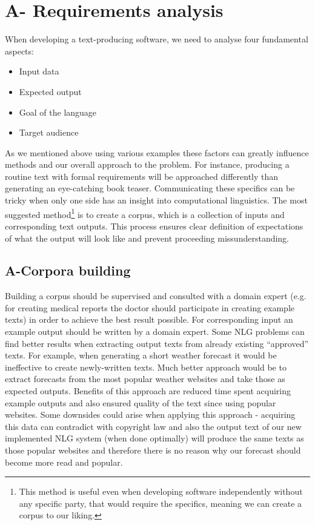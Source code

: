 \chapter{A- Requirements analysis}

When developing a text-producing software, we need to analyse four fundamental aspects:

\begin{itemize}
\item Input data
\item Expected output
\item Goal of the language 
\item Target audience  
\end{itemize}

As we mentioned above using various examples these factors can greatly influence methods and our overall approach to the problem. For instance, producing a routine text with formal requirements will be approached differently than generating an eye-catching book teaser. Communicating these specifics can be tricky when only one side has an insight into computational linguistics. The most suggested method\footnote{This method is useful even when developing software independently without any specific party, that would require the specifics, meaning we can create a corpus to our liking.} is to create a corpus, which is a collection of inputs and corresponding text outputs. This process ensures clear definition of expectations of what the output will look like and prevent proceeding missunderstanding. 

\section{A-Corpora building}
Building a corpus should be supervised and consulted with a domain expert (e.g. for creating medical reports the doctor should participate in creating example texts) in order to achieve the best result possible. For corresponding input an example output should be written by a domain expert. Some NLG problems can find better results when extracting output texts from already existing “approved” texts. For example, when generating a short weather forecast it would be ineffective to create newly-written texts. Much better approach would be to extract forecasts from the most popular weather websites and take those as expected outputs. Benefits of this approach are reduced time spent acquiring example outputs and also ensured quality of the text since using popular websites. Some downsides could arise when applying this approach - acquiring this data can contradict with copyright law and also the output text of our new implemented NLG system (when done optimally) will produce the same texts as those popular websites and therefore there is no reason why our forecast should become more read and popular.

